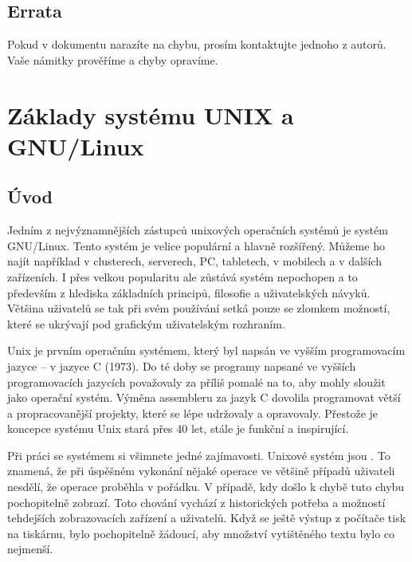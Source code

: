 \documentclass{article}
\begin{document}
\subsection{Errata}
Pokud v dokumentu narazíte na chybu, prosím kontaktujte jednoho z autorů. Vaše námitky prověříme a chyby opravíme.

\newpage

\section{Základy systému UNIX a GNU/Linux}
\subsection{Úvod}
Jedním z nejvýznamnějších zástupců unixových operačních systémů je systém GNU/Linux. Tento systém je velice populární a hlavně rozšířený. Můžeme ho
najít například v clusterech, serverech, PC, tabletech, v mobilech a v dalších zařízeních. I přes velkou popularitu ale zůstává systém nepochopen a to
především z hlediska základních principů, filosofie a uživatelských návyků. Většina  uživatelů se tak při svém používání setká pouze se zlomkem možností, které se ukrývají pod grafickým uživatelským rozhraním. 

Unix je prvním operačním systémem, který byl napsán ve vyšším programovacím jazyce -- v jazyce C (1973). Do té doby se programy napsané ve vyšších programovacích jazycích považovaly za příliš pomalé na to, aby mohly sloužit jako operační systém. Výměna assembleru za jazyk C dovolila programovat větší a propracovanější projekty, které se lépe udržovaly a opravovaly. Přestože je koncepce systému Unix stará přes 40 let, stále je funkční a inspirující. 

Při práci se systémem si všimnete jedné zajímavosti. Unixové systém jsou . To znamená, že při úspěšném vykonání nějaké operace ve většině případů uživateli nesdělí, že operace proběhla v pořádku. V případě, kdy došlo k chybě tuto chybu pochopitelně zobrazí. Toto chování vychází z historických potřeba a možností tehdejších zobrazovacích zařízení a uživatelů. Když se ještě výstup z počítače tisk na tiskárnu, bylo pochopitelně žádoucí, aby množství vytištěného textu bylo co nejmenší.
\end{document}
